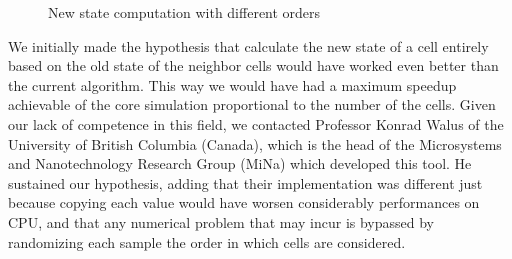 \begin{figure}[h!tb]
	\caption{New state computation with different orders}
	\label{fig:cpu_alg}
\end{figure}
We initially made the hypothesis that calculate the new state of a cell entirely based on the old state of the neighbor cells would have worked even better than the current algorithm. This way we would have had a maximum speedup achievable of the core simulation proportional to the number of the cells.
Given our lack of competence in this field, we contacted Professor Konrad Walus of the University of British Columbia (Canada), which is the head of the Microsystems and Nanotechnology Research Group (MiNa) which developed this tool. He sustained our hypothesis, adding that their implementation was different just because copying each value would have worsen considerably performances on CPU, and that any numerical problem that may incur is bypassed by randomizing each sample the order in which cells are considered.\newline
